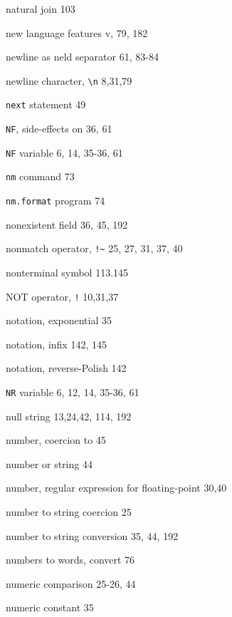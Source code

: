 \begin{multicols}{3}
\hangindent=4pc  natural join 103

\hangindent=4pc  new language features v, 79, 182

\hangindent=4pc  newline as neld separator 61,  83-84

\hangindent=4pc  newline character, \verb'\n' 8,31,79

\hangindent=4pc  \verb'next' statement 49

\hangindent=4pc  \verb'NF', side-effects on 36, 61

\hangindent=4pc  \verb'NF' variable 6, 14, 35-36, 61

\hangindent=4pc  \verb'nm' command 73

\hangindent=4pc  \verb'nm.format' program 74


\hangindent=4pc  nonexistent field 36, 45, 192

\hangindent=4pc  nonmatch operator, \verb'!~' 25, 27, 31, 37, 40

\hangindent=4pc  nonterminal symbol 113.145

\hangindent=4pc  NOT operator, \verb'!' 10,31,37

\hangindent=4pc  notation, exponential 35

\hangindent=4pc  notation, infix 142, 145

\hangindent=4pc  notation, reverse-Polish 142

\hangindent=4pc  \verb'NR' variable 6, 12, 14, 35-36, 61

\hangindent=4pc  null string 13,24,42, 114, 192

\hangindent=4pc  number, coercion to 45

\hangindent=4pc  number or string 44

\hangindent=4pc  number, regular expression for floating-point 30,40

\hangindent=4pc  number to string coercion 25

\hangindent=4pc  number to string conversion 35,  44, 192

\hangindent=4pc  numbers to words, convert 76

\hangindent=4pc  numeric comparison 25-26, 44

\hangindent=4pc  numeric constant 35


\end{multicols}
